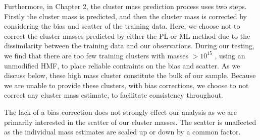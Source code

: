 Furthermore, in Chapter 2, the cluster mass prediction process uses two steps. Firstly the cluster mass is predicted, and then the cluster mass is corrected by considering the bias and scatter of the training data. Here, we choose not to correct the cluster masses predicted by either the PL or ML method due to the dissimilarity between the training data and our observations. During our testing, we find that there are too few training clusters with masses $> 10^{15}$ \Msol, using an unmodified HMF, to place reliable contraints on the bias and scatter. As we discuss below, these high mass cluster constitute the bulk of our sample. Because we are unable to provide these clusters, with bias corrections, we choose to not correct any cluster mass estimate, to facilitate consistency throughout. 

The lack of a bias correction does not strongly effect our analysis as we are primarily interested in the scatter of our cluster masses. The scatter is unaffected as the individual mass estimates are scaled up or down by a common factor.

